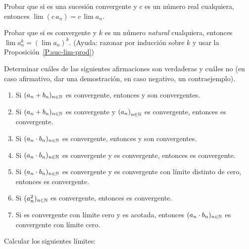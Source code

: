 \item Probar que si \sucan es una sucesión convergente y $c$ es un número real cualquiera, entonces $\lim (c \, a_n) = c\, \lim a_n$.

\item Probar que si \sucan es convergente y $k$ es un número \emph{natural} cualquiera, entonces $\lim a_n^k = \left(\lim a_n\right)^k$. (Ayuda: razonar por inducción sobre $k$ y usar la Proposición~\ref{P:suc-lim-prod})

\item Determinar cuáles de las siguientes afirmaciones son verdaderas y cuáles no (en caso afirmativo, dar una demostración, en caso negativo, un contraejemplo).
\begin{enumerate}
    \item Si $(a_n+b_n)_{n\in\mathbb{N}}$ es convergente, entonces \sucan y \sucbn son convergentes.
    \item Si $(a_n+b_n)_{n\in\mathbb{N}}$ es convergente y $\left(a_n\right)_{n\in\mathbb{N}}$ es convergente, entonces \sucbn es convergente.
    \item Si $(a_n\cdot b_n)_{n\in\mathbb{N}}$ es convergente, entonces \sucan y \sucbn son convergentes.
    \item Si $(a_n\cdot b_n)_{n\in\mathbb{N}}$ es convergente y \sucan es convergente, entonces \sucbn es convergente.
    \item Si $(a_n\cdot b_n)_{n\in\mathbb{N}}$ es convergente y \sucan es convergente con límite distinto de cero, entonces \sucbn es convergente.
    \item Si $(a_n^2)_{n\in\mathbb{N}}$ es convergente, entonces \sucan es convergente.
    \item Si \sucan es convergente con límite cero y \sucbn es acotada, entonces $(a_n\cdot b_n)_{n\in\mathbb{N}}$ es convergente con límite cero.
\end{enumerate}

\item Calcular los siguientes límites:

